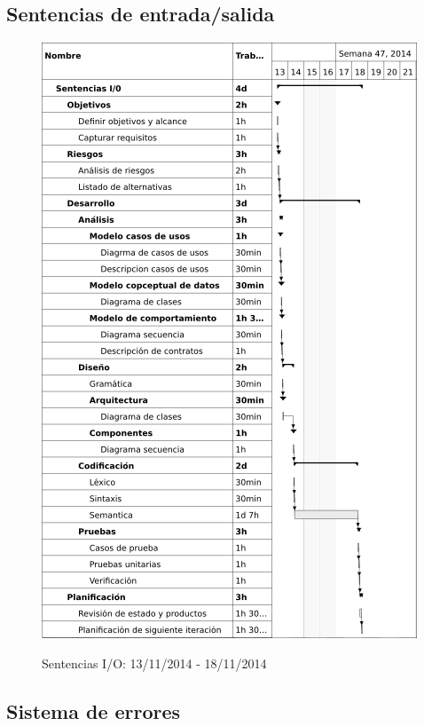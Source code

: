 \subsection{Sentencias de entrada/salida}

\begin{center}
\begin{figure}[H]
\centering
\includegraphics[scale=1]{planning/3-sentencias-io.png} \\
\caption{Sentencias I/O: 13/11/2014 - 18/11/2014 }
\end{figure}
\end{center}

\subsection{Sistema de errores}

